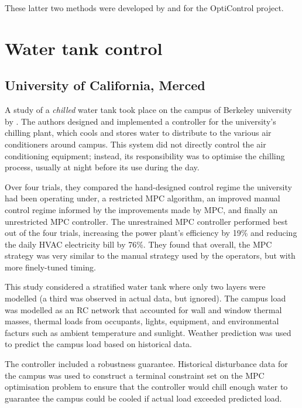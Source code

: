 These latter two methods were developed by and for the OptiControl project.

\section{Water tank control}


\subsection{University of California, Merced}

A study of a \emph{chilled} water tank took place on the campus of Berkeley university by \textcite{Ma12}.
The authors designed and implemented a controller for the university's chilling plant, which cools and stores water to distribute to the various air conditioners around campus.
This system did not directly control the air conditioning equipment; instead, its responsibility was to optimise the chilling process, usually at night before its use during the day.

Over four trials, they compared the hand-designed control regime the university had been operating under, a restricted MPC algorithm, an improved manual control regime informed by the improvements made by MPC, and finally an unrestricted MPC controller.
The unrestrained MPC controller performed best out of the four trials, increasing the power plant's efficiency by 19\% and reducing the daily HVAC electricity bill by 76\%.
They found that overall, the MPC strategy was very similar to the manual strategy used by the operators, but with more finely-tuned timing.

This study considered a stratified water tank where only two layers were modelled (a third was observed in actual data, but ignored).
The campus load was modelled as an RC network that accounted for wall and window thermal masses, thermal loads from occupants, lights, equipment, and environmental facturs such as ambient temperature and sunlight.
Weather prediction was used to predict the campus load based on historical data.

The controller included a robustness guarantee.
Historical disturbance data for the campus was used to construct a terminal constraint set on the MPC optimisation problem to ensure that the controller would chill enough water to guarantee the campus could be cooled if actual load exceeded predicted load.

